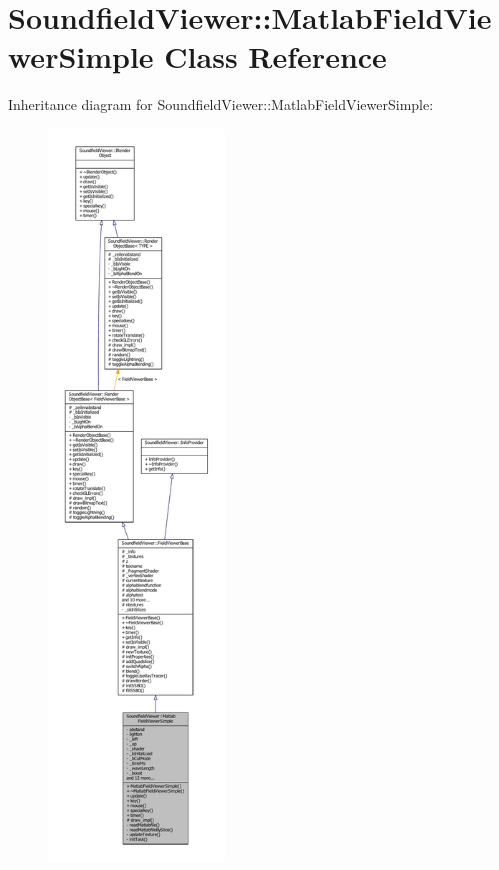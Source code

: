\section{Soundfield\-Viewer\-:\-:Matlab\-Field\-Viewer\-Simple Class Reference}
\label{classSoundfieldViewer_1_1MatlabFieldViewerSimple}


Inheritance diagram for Soundfield\-Viewer\-:\-:Matlab\-Field\-Viewer\-Simple\-:\nopagebreak
\begin{figure}[H]
\begin{center}
\leavevmode
\includegraphics[height=550pt]{de/d7a/classSoundfieldViewer_1_1MatlabFieldViewerSimple__inherit__graph}
\end{center}
\end{figure}


